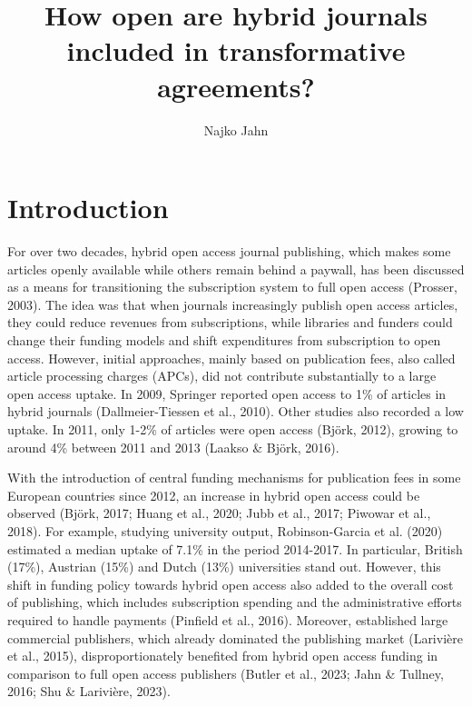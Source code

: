 \documentclass[a4paper,man,floatsintext,longtable,noextraspace,12pt]{apa6}
\title{\textbf{How open are hybrid journals included in transformative agreements?}}
\author{Najko Jahn}
\affiliation{Göttingen State and University Library, University of Göttingen\\
Platz der Göttinger Sieben 1, 37073 Göttingen, Germany\\
najko.jahn@sub.uni-goettingen.de
}
\begin{document}
\maketitle


\hypertarget{introduction}{%
\section{Introduction}\label{introduction}}

For over two decades, hybrid open access journal publishing, which makes
some articles openly available while others remain behind a paywall, has
been discussed as a means for transitioning the subscription system to
full open access (Prosser, 2003). The idea was that when journals
increasingly publish open access articles, they could reduce revenues
from subscriptions, while libraries and funders could change their
funding models and shift expenditures from subscription to open access.
However, initial approaches, mainly based on publication fees, also
called article processing charges (APCs), did not contribute
substantially to a large open access uptake. In 2009, Springer reported
open access to 1\% of articles in hybrid journals (Dallmeier-Tiessen et
al., 2010). Other studies also recorded a low uptake. In 2011, only
1-2\% of articles were open access (Björk, 2012), growing to around 4\%
between 2011 and 2013 (Laakso \& Björk, 2016).

With the introduction of central funding mechanisms for publication fees
in some European countries since 2012, an increase in hybrid open access
could be observed (Björk, 2017; Huang et al., 2020; Jubb et al., 2017;
Piwowar et al., 2018). For example, studying university output,
Robinson-Garcia et al. (2020) estimated a median uptake of 7.1\% in the
period 2014-2017. In particular, British (17\%), Austrian (15\%) and
Dutch (13\%) universities stand out. However, this shift in funding
policy towards hybrid open access also added to the overall cost of
publishing, which includes subscription spending and the administrative
efforts required to handle payments (Pinfield et al., 2016). Moreover,
established large commercial publishers, which already dominated the
publishing market (Larivière et al., 2015), disproportionately benefited
from hybrid open access funding in comparison to full open access
publishers (Butler et al., 2023; Jahn \& Tullney, 2016; Shu \&
Larivière, 2023).
\end{document}
